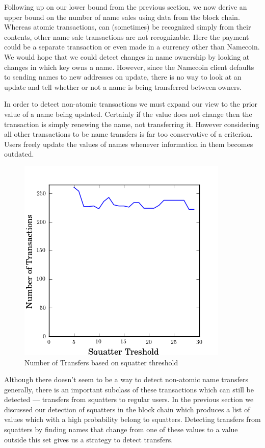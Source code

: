 Following up on our lower bound from the previous section, we now derive an upper bound on the number of name sales using data from the block chain. Whereas atomic transactions, can (sometimes) be recognized simply from their contents, other name sale transactions are not recognizable. Here the payment could be a separate transaction or even made in a currency other than Namecoin. We would hope that we could detect changes in name ownership by looking at changes in which key owns a name. However, since the Namecoin client defaults to sending names to new addresses on update, there is no way to look at an update and tell whether or not a name is being transferred between owners.

In order to detect non-atomic transactions we must expand our view to the prior value of a name being updated. Certainly if the value does not change then the transaction is simply renewing the name, not transferring it. However considering all other transactions to be name transfers is far too conservative of a criterion. Users freely update the values of names whenever information in them becomes outdated.

\begin{figure}
  \centering
  \includegraphics[width=0.9\columnwidth]{figures/transfers}
  \caption{Number of Transfers based on squatter threshold}
  \label{fig:percentSquatter}
\end{figure}

Although there doesn't seem to be a way to detect non-atomic name transfers generally, there is an important subclass of these transactions which can still be detected --- transfers from squatters to regular users. In the previous section we discussed our detection of squatters in the block chain which produces a list of values which with a high probability belong to squatters. Detecting transfers from squatters by finding names that change from one of these values to a value outside this set gives us a strategy to detect transfers.

